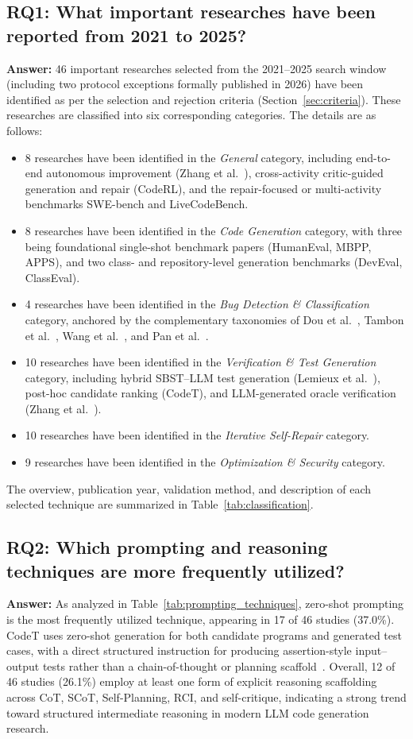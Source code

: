 \documentclass[10pt,a4paper]{article}
\begin{document}
\subsection*{RQ1: What important researches have been reported from 2021 to 2025?}
\textbf{Answer:} 46 important researches selected from the 2021--2025 search window (including two protocol exceptions formally published in 2026) have been identified as per the selection and rejection criteria (Section~\ref{sec:criteria}). These researches are classified into six corresponding categories. The details are as follows:
\begin{itemize}[leftmargin=*]
\item 8 researches have been identified in the \textit{General} category, including end-to-end autonomous improvement (Zhang et al.~\cite{zhang2024autocoderover}), cross-activity critic-guided generation and repair (CodeRL), and the repair-focused or multi-activity benchmarks SWE-bench and LiveCodeBench.
\item 8 researches have been identified in the \textit{Code Generation} category, with three being foundational single-shot benchmark papers (HumanEval, MBPP, APPS), and two class- and repository-level generation benchmarks (DevEval, ClassEval).
\item 4 researches have been identified in the \textit{Bug Detection \& Classification} category, anchored by the complementary taxonomies of Dou et al.~\cite{dou2026}, Tambon et al.~\cite{tambon2025}, Wang et al.~\cite{wang2025where}, and Pan et al.~\cite{pan2024lost}.
\item 10 researches have been identified in the \textit{Verification \& Test Generation} category, including hybrid SBST--LLM test generation (Lemieux et al.~\cite{lemieux2023codamosa}), post-hoc candidate ranking (CodeT), and LLM-generated oracle verification (Zhang et al.~\cite{zhang2023algo}).
\item 10 researches have been identified in the \textit{Iterative Self-Repair} category.
\item 9 researches have been identified in the \textit{Optimization \& Security} category.
\end{itemize}
The overview, publication year, validation method, and description of each selected technique are summarized in Table~\ref{tab:classification}.

\subsection*{RQ2: Which prompting and reasoning techniques are more frequently utilized?}
\textbf{Answer:} As analyzed in Table~\ref{tab:prompting_techniques}, zero-shot prompting is the most frequently utilized technique, appearing in 17 of 46 studies (37.0\%). CodeT uses zero-shot generation for both candidate programs and generated test cases, with a direct structured instruction for producing assertion-style input--output tests rather than a chain-of-thought or planning scaffold~\cite{chenbei2023}. Overall, 12 of 46 studies (26.1\%) employ at least one form of explicit reasoning scaffolding across CoT, SCoT, Self-Planning, RCI, and self-critique, indicating a strong trend toward structured intermediate reasoning in modern LLM code generation research.
\end{document}
